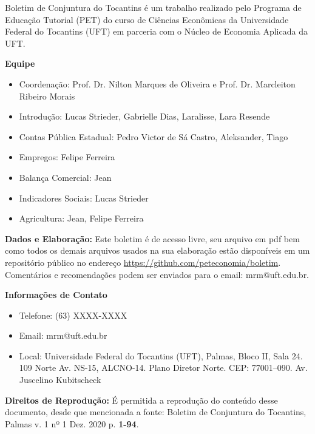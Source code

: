 \begin{tcolorbox}[colback=boxbackground, colframe=boxbackground, arc=0mm, top=15pt]
Boletim de Conjuntura do Tocantins é um trabalho realizado pelo Programa de Educação Tutorial (PET) do curso de Ciências Econômicas da Universidade Federal do Tocantins (UFT) em parceria com o Núcleo de Economia Aplicada da UFT.
\\
\par{\bf Equipe}
\begin{itemize}
	\item Coordenação: Prof. Dr. Nilton Marques de Oliveira e Prof. Dr. Marcleiton Ribeiro Morais
	\item Introdução: Lucas Strieder, Gabrielle Dias, Laralisse, Lara Resende
	\item Contas Pública Estadual: Pedro Victor de Sá Castro, Aleksander, Tiago
	\item Empregos: Felipe Ferreira
	\item Balança Comercial: Jean
	\item Indicadores Sociais: Lucas Strieder
	\item Agricultura: Jean, Felipe Ferreira
\end{itemize}
\par{\bf Dados e Elaboração:}
Este boletim é de acesso livre, seu arquivo em pdf bem como todos os demais arquivos usados na sua elaboração estão disponíveis em um repositório público no endereço \url{https://github.com/peteconomia/boletim}. Comentários e recomendações podem ser enviados para o email: mrm@uft.edu.br.
\\
\par{\bf Informações de Contato}
\begin{itemize}
	\item{Telefone:} (63) XXXX-XXXX
	\item{Email:} mrm@uft.edu.br
	\item{Local:} Universidade Federal do Tocantins (UFT), Palmas, Bloco II, Sala 24. 109 Norte Av. NS-15, ALCNO-14. Plano Diretor Norte. CEP: 77001--090. Av. Juscelino Kubitscheck
\end{itemize}
\par{\bf Direitos de Reprodução:}
É permitida a reprodução do conteúdo desse documento, desde que mencionada a fonte: Boletim de Conjuntura do Tocantins, Palmas v. 1 nº 1 Dez. 2020 p. \textbf{1-94}.
\end{tcolorbox}


